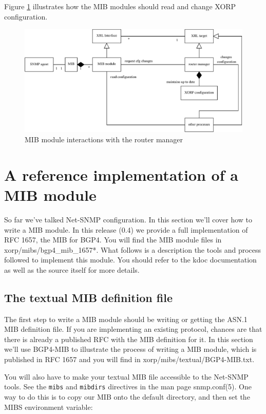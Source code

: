 \documentclass[11pt]{article}
\begin{document}
Figure \ref{fig:mib-class-diag} illustrates how the MIB modules should read and
change XORP configuration.

\begin{figure}
  \begin{center}
    \includegraphics[width=1\textwidth]{figs/snmp_fig1}
  \end{center}
  \caption{MIB module interactions with the router manager}
  \label{fig:mib-class-diag}
\end{figure}


\section{A reference implementation of a MIB module}

So far we've talked Net-SNMP configuration.  In this section we'll cover
how to write a MIB module.  In this release (0.4) we provide a full
implementation of RFC 1657, the MIB for BGP4.  You will find the MIB module
files in xorp/mibs/bgp4\_mib\_1657*.  What follows is a description the tools
and process followed to implement this module.  You should refer to the
kdoc documentation as well as the source itself for more details.   

\subsection{The textual MIB definition file}
The first step to write a MIB module should be writing or getting the ASN.1 MIB
definition file.  If you are implementing an existing protocol, chances are
that there is already a published RFC with the MIB definition for it.  In this
section we'll use BGP4-MIB to illustrate the process of writing a MIB module,
which is published in RFC 1657 and you will find in
xorp/mibs/textual/BGP4-MIB.txt.

You will also have to  make your textual MIB file accessible to the Net-SNMP
tools.  See the \texttt{mibs} and \texttt{mibdirs} directives in the man page
snmp.conf(5).  One way to do this is to copy our MIB onto the default directory,
and then set the MIBS environment variable:
\end{document}
